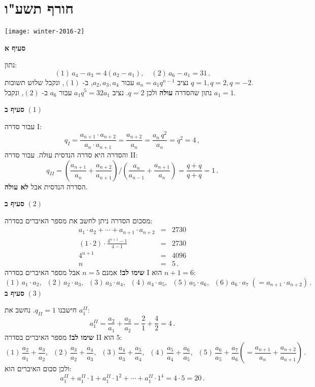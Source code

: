 \np

\section{חורף תשע"ו}

\begin{center}
\texttt{[image: winter-2016-2]}
\end{center}

\textbf{סעיף א}

נתון:
\[
(1)\, a_4-a_3 = 4 (a_2-a_1),\quad (2)\, a_6 - a_1 = 31\,.
\]
נציב
$a_n=a_1q^{n-1}$ 
עבור
$a_2, a_3, a_4$,
ב-%
$(1)$,
ונקבל שלוש תשובות
$q=1,q=2,q=-2$.\\
נתון שהסדרה 
\textbf{עולה}
ולכן
$q=2$.
נציב 
$a_1q^5=32 a_1$
עבור
$a_6$
ב-%
$(2)$,
ונקבל
$a_1=1$.

\textbf{סעיף ב} 
$(1)$

עבור סדרה I:
\[
q_I=\frac{a_{n+1}\cdot a_{n+2}}{a_n\cdot a_{n+1}}=\frac{a_{n+2}}{a_n}=\frac{a_n\,q^2}{a_n}=q^2=4\,,
\]
והסדרה היא סדרה הנדסית עולה. עבור סדרה II:
\[
q_{II}=\left(\frac{a_{n+1}}{a_n} + \frac{a_{n+2}}{a_{n+1}}\right) / \left(\frac{a_{n}}{a_{n-1}} + \frac{a_{n+1}}{a_{n}}\right)=\frac{q+q}{q+q}=1\,.
\]
הסדרה הנדסית אבל
\textbf{לא עולה}.

\textbf{סעיף ב}
$(2)$

מסכום הסדרה ניתן לחשב את מספר האיברים בסדרה:
\begin{eqnarray*}
a_1\cdot a_2 + \cdots + a_{n+1} \cdot a_{n+2} &=& 2730\\
(1\cdot 2)\cdot \frac{4^{n+1}-1}{4-1}&=&2730\\
4^{n+1}&=&4096\\
n&=&5\,.
\end{eqnarray*}
\textbf{שימו לב!}
אמנם
$n=5$
אבל מספר האיברים בסדרה I הוא 
$n+1=6$:
\[
(1)\, a_1\cdot a_2,\;\; (2)\,a_2\cdot a_3,\;\;(3)\, a_3\cdot a_4,\;\; (4)\,a_4\cdot a_5,\;\; (5)\,a_5\cdot a_6,\;\; (6)\,a_6\cdot a_7 \;(= a_{n+1}\cdot a_{n+2})\,.
\]
\textbf{סעיף ב}
$(3)$

חישבנו
$q_{II}=1$.
נחשב את
$a_1^{II}$:
\[
a_1^{II}=\frac{a_{2}}{a_1} + \frac{a_{3}}{a_{2}}=\frac{2}{1}+\frac{4}{2}=4\,.
\]
\textbf{שימו לב!}
מספר האיברים בסדרה II הוא 
$5$:
\[
(1)\,\frac{a_2}{a_1}+\frac{a_3}{a_2},\;\;
(2)\,\frac{a_3}{a_2}+\frac{a_4}{a_3},\;\;
(3)\,\frac{a_4}{a_3}+\frac{a_5}{a_4},\;\;
(4)\,\frac{a_5}{a_4}+\frac{a_6}{a_5},\;\;
(5)\,\frac{a_6}{a_5}+\frac{a_7}{a_6} \left(= \frac{a_{n+1}}{a_n}+\frac{a_{n+2}}{a_{n+1}}\right)\,.
\]
ולכן סכום האיברים הוא:
\[
a_1^{II}+a_1^{II}\cdot 1 + a_1^{II}\cdot 1^2 + \cdots + a_1^{II}\cdot 1^4 = 4\cdot 5=20\,.
\]

